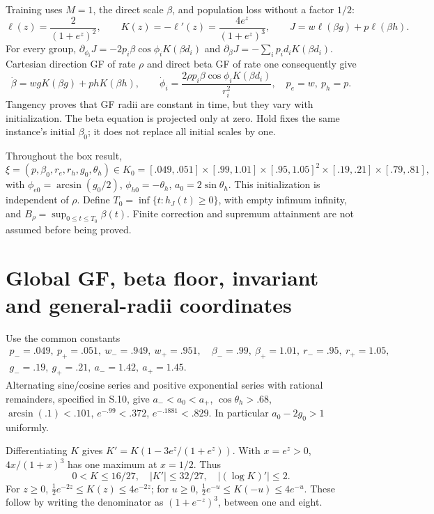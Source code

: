 \documentclass[11pt,a4paper]{article}
\begin{document}
Training uses $M=1$, the direct scale $\beta$, and population loss without a factor $1/2$:
\[
 \ell(z)=\frac{2}{(1+e^z)^2},\qquad K(z)=-\ell'(z)=\frac{4e^z}{(1+e^z)^3},
 \qquad J=w\ell(\beta g)+p\ell(\beta h).
\]
For every group, $\partial_{\phi_i}J=-2p_i\beta\cos\phi_iK(\beta d_i)$ and $\partial_\beta J=-\sum_i p_i d_iK(\beta d_i)$. Cartesian direction GF of rate $\rho$ and direct beta GF of rate one consequently give
\[
 \dot\beta=wgK(\beta g)+phK(\beta h),\qquad
 \dot\phi_i=\frac{2\rho p_i\beta\cos\phi_iK(\beta d_i)}{r_i^2},
 \quad p_e=w,\ p_h=p .
\]
Tangency proves that GF radii are constant in time, but they vary with initialization. The beta equation is projected only at zero. Hold fixes the same instance's initial $\beta_0$; it does not replace all initial scales by one.

Throughout the box result,
\[
 \xi=(p,\beta_0,r_e,r_h,g_0,\theta_h)\in
 K_0=[.049,.051]\times[.99,1.01]\times[.95,1.05]^2
       \times[.19,.21]\times[.79,.81],
\]
with $\phi_{e0}=\arcsin(g_0/2)$, $\phi_{h0}=-\theta_h$, $a_0=2\sin\theta_h$. This initialization is independent of $\rho$. Define $T_0=\inf\{t:h_J(t)\ge0\}$, with empty infimum infinity, and $B_\rho=\sup_{0\le t\le T_0}\beta(t)$. Finite correction and supremum attainment are not assumed before being proved.

\section{Global GF, beta floor, invariant and general-radii coordinates}

Use the common constants
\[
\begin{gathered}
 p_-=.049,\ p_+=.051,\ w_-=.949,\ w_+=.951,\quad
 \beta_-=.99,\ \beta_+=1.01,\ r_-=.95,\ r_+=1.05,\\
 g_-=.19,\ g_+=.21,\ a_-=1.42,\ a_+=1.45 .
\end{gathered}
\]
Alternating sine/cosine series and positive exponential series with rational remainders, specified in S.10, give $a_-<a_0<a_+$, $\cos\theta_h>.68$, $\arcsin(.1)<.101$, $e^{-.99}<.372$, $e^{-.1881}<.829$. In particular $a_0-2g_0>1$ uniformly.

Differentiating $K$ gives $K'=K(1-3e^z/(1+e^z))$. With $x=e^z>0$, $4x/(1+x)^3$ has one maximum at $x=1/2$. Thus
\[
 0<K\le16/27,\quad |K'|\le32/27,\quad |(\log K)'|\le2.
\]
For $z\ge0$, $\frac12e^{-2z}\le K(z)\le4e^{-2z}$; for $u\ge0$, $\frac12e^{-u}\le K(-u)\le4e^{-u}$. These follow by writing the denominator as $(1+e^{-z})^3$, between one and eight.
\end{document}
